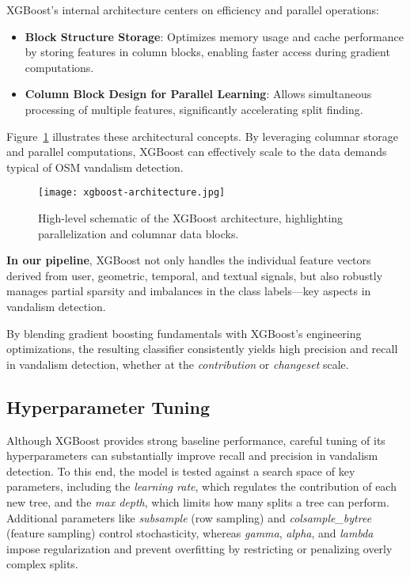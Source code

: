 \documentclass[
    13pt, %
    a4paper, %
    DIV14, %
    listof=totoc, %
    bibliography=totoc, %
    index=totoc, %
    headsepline
]{scrreprt}
\begin{document}
\noindent
XGBoost’s internal architecture centers on efficiency and parallel operations:

\begin{itemize}
    \item \textbf{Block Structure Storage}:
    Optimizes memory usage and cache performance by storing features in column blocks, enabling faster access during gradient computations.

    \item \textbf{Column Block Design for Parallel Learning}:
    Allows simultaneous processing of multiple features, significantly accelerating split finding.

\end{itemize}

\noindent
Figure~\ref{fig:xgboost_architecture} illustrates these architectural concepts. By leveraging columnar storage and parallel computations, XGBoost can effectively scale to the data demands typical of OSM vandalism detection.


\begin{figure}[H]
    \centering
    \texttt{[image: xgboost-architecture.jpg]}
    \caption{High-level schematic of the XGBoost architecture, highlighting parallelization and columnar data blocks. \cite{tutorialspoint2025}}
    \label{fig:xgboost_architecture}
\end{figure}

\noindent
\textbf{In our pipeline}, XGBoost not only handles the individual feature vectors derived from user,
geometric, temporal, and textual signals, but also robustly manages partial sparsity
and imbalances in the class labels—key aspects in vandalism detection.

By blending gradient boosting fundamentals with XGBoost’s engineering optimizations, the resulting classifier consistently yields high precision and recall in vandalism detection, whether at the \emph{contribution} or \emph{changeset} scale.

\subsection{Hyperparameter Tuning}
\label{sec:hyperparameter_tuning}

Although XGBoost provides strong baseline performance, careful tuning of its hyperparameters can substantially improve recall and precision in vandalism detection. To this end, the model is tested against a search space of key parameters, including the \emph{learning rate}, which regulates the contribution of each new tree, and the \emph{max depth}, which limits how many splits a tree can perform. Additional parameters like \emph{subsample} (row sampling) and \emph{colsample\_bytree} (feature sampling) control stochasticity, whereas \emph{gamma}, \emph{alpha}, and \emph{lambda} impose regularization and prevent overfitting by restricting or penalizing overly complex splits.
\end{document}
